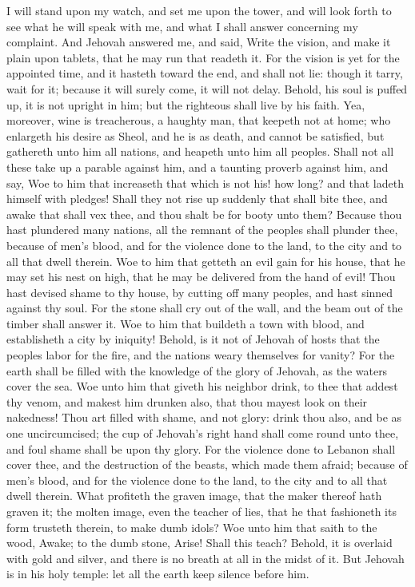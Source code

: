 I will stand upon my watch, and set me upon the tower, and will look forth to see what he will speak with me, and what I shall answer concerning my complaint. And Jehovah answered me, and said, Write the vision, and make it plain upon tablets, that he may run that readeth it. For the vision is yet for the appointed time, and it hasteth toward the end, and shall not lie: though it tarry, wait for it; because it will surely come, it will not delay.  Behold, his soul is puffed up, it is not upright in him; but the righteous shall live by his faith. Yea, moreover, wine is treacherous, a haughty man, that keepeth not at home; who enlargeth his desire as Sheol, and he is as death, and cannot be satisfied, but gathereth unto him all nations, and heapeth unto him all peoples. Shall not all these take up a parable against him, and a taunting proverb against him, and say, Woe to him that increaseth that which is not his! how long? and that ladeth himself with pledges! Shall they not rise up suddenly that shall bite thee, and awake that shall vex thee, and thou shalt be for booty unto them? Because thou hast plundered many nations, all the remnant of the peoples shall plunder thee, because of men’s blood, and for the violence done to the land, to the city and to all that dwell therein.  Woe to him that getteth an evil gain for his house, that he may set his nest on high, that he may be delivered from the hand of evil! Thou hast devised shame to thy house, by cutting off many peoples, and hast sinned against thy soul. For the stone shall cry out of the wall, and the beam out of the timber shall answer it.  Woe to him that buildeth a town with blood, and establisheth a city by iniquity! Behold, is it not of Jehovah of hosts that the peoples labor for the fire, and the nations weary themselves for vanity? For the earth shall be filled with the knowledge of the glory of Jehovah, as the waters cover the sea.  Woe unto him that giveth his neighbor drink, to thee that addest thy venom, and makest him drunken also, that thou mayest look on their nakedness! Thou art filled with shame, and not glory: drink thou also, and be as one uncircumcised; the cup of Jehovah’s right hand shall come round unto thee, and foul shame shall be upon thy glory. For the violence done to Lebanon shall cover thee, and the destruction of the beasts, which made them afraid; because of men’s blood, and for the violence done to the land, to the city and to all that dwell therein.  What profiteth the graven image, that the maker thereof hath graven it; the molten image, even the teacher of lies, that he that fashioneth its form trusteth therein, to make dumb idols? Woe unto him that saith to the wood, Awake; to the dumb stone, Arise! Shall this teach? Behold, it is overlaid with gold and silver, and there is no breath at all in the midst of it. But Jehovah is in his holy temple: let all the earth keep silence before him. 


